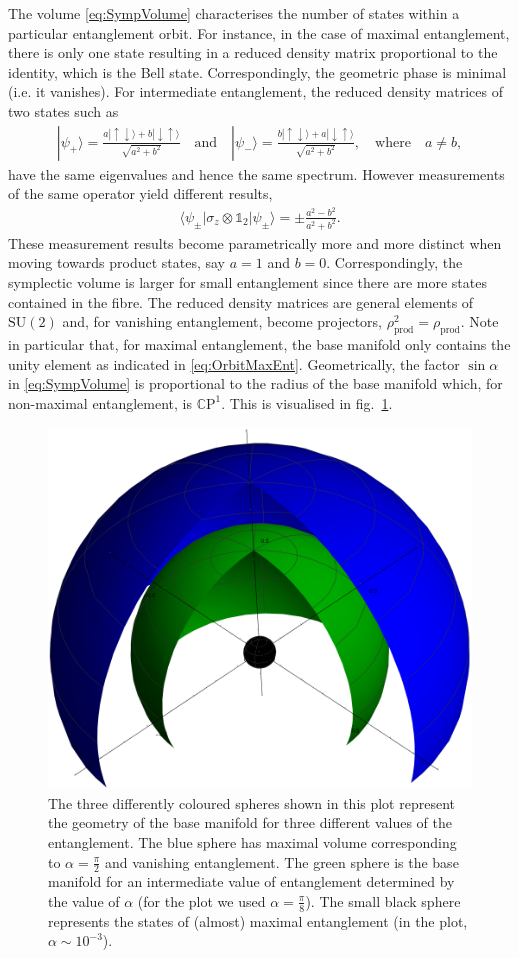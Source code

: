 \documentclass[a4paper,11pt]{article}
\newcommand{\CP}[1]{\mathds{C}\text{P}^{#1}}
\newcommand{\SU}{\text{SU}}
\newcommand{\1}{\mathds{1}}
\begin{document}
The volume \eqref{eq:SympVolume} characterises the number of states within a particular entanglement orbit. For instance, in the case of maximal entanglement, there is only one state resulting in a reduced density matrix proportional to the identity, which is the Bell state. Correspondingly, the geometric phase is minimal (i.e. it vanishes). For intermediate entanglement, the reduced density matrices of two states such as
\begin{align}
    |\psi_+\rangle=\frac{a|\!\uparrow\downarrow\rangle+b|\!\downarrow\uparrow\rangle}{\sqrt{a^2+b^2}}\quad\text{and}\quad|\psi_-\rangle=\frac{b|\!\uparrow\downarrow\rangle+a|\!\downarrow\uparrow\rangle}{\sqrt{a^2+b^2}},\quad\text{where}\quad a\neq b,
\end{align}
have the same eigenvalues and hence the same spectrum. However measurements of the same operator yield different results,
\begin{align}
    \langle\psi_\pm|\sigma_z\otimes\1_2|\psi_\pm\rangle=\pm\frac{a^2-b^2}{a^2+b^2}.
\end{align}
These measurement results become parametrically more and more distinct when moving towards product states, say $a=1$ and $b=0$. Correspondingly, the symplectic volume is larger for small entanglement since there are more states contained in the fibre. The reduced density matrices are general elements of $\SU(2)$ and, for vanishing entanglement, become projectors, $\rho_{\text{prod}}^2=\rho_{\text{prod}}$. Note in particular that, for maximal entanglement, the base manifold only contains the unity element as indicated in \eqref{eq:OrbitMaxEnt}. Geometrically, the factor $\sin\alpha$ in \eqref{eq:SympVolume} is proportional to the radius of the base manifold which, for non-maximal entanglement, is $\CP{1}$. This is visualised in fig.~\ref{fig:BaseSpaceVisualised}.

\begin{figure}[hb]
    \centering
    \includegraphics[width=0.5\linewidth]{BaseSpaceVisualised.png}
    \caption{The three differently coloured spheres shown in this plot represent the geometry of the base manifold for three different values of the entanglement. The blue sphere has maximal volume corresponding to $\alpha=\frac{\pi}{2}$ and vanishing entanglement. The green sphere is the base manifold for an intermediate value of entanglement determined by the value of $\alpha$ (for the plot we used $\alpha=\frac{\pi}{8}$). The small black sphere represents the states of (almost) maximal entanglement (in the plot, $\alpha\sim 10^{-3}$).}
    \label{fig:BaseSpaceVisualised}
\end{figure}
\end{document}
